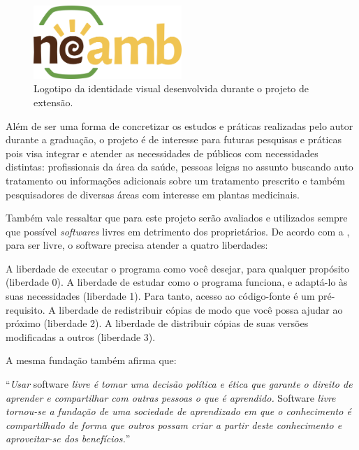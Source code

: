 \begin{figure}[!htbp]
\centering
\caption{\label{fig-neamb}Logotipo da identidade visual desenvolvida durante o projeto de extensão.}
\includegraphics[width=0.5\textwidth]{images/drive/image_5.png}
\end{figure}


Além de ser uma forma de concretizar os estudos e práticas realizadas pelo autor durante a graduação, o projeto é de interesse para futuras pesquisas e práticas pois visa integrar e atender as necessidades de públicos com necessidades distintas: profissionais da área da saúde, pessoas leigas no assunto buscando auto tratamento ou informações adicionais sobre um tratamento prescrito e também pesquisadores de diversas áreas com interesse em plantas medicinais.

Também vale ressaltar que para este projeto serão avaliados e utilizados sempre que possível \emph{softwares} livres em detrimento dos proprietários. De acordo com a \textcite{gnuproj}, para ser livre, o software precisa atender a quatro liberdades:

\begin{citacao}
A liberdade de executar o programa como você desejar, para qualquer propósito (liberdade 0). A liberdade de estudar como o programa funciona, e adaptá-lo às suas necessidades (liberdade 1). Para tanto, acesso ao código-fonte é um pré-requisito. A liberdade de redistribuir cópias de modo que você possa ajudar ao próximo (liberdade 2). A liberdade de distribuir cópias de suas versões modificadas a outros (liberdade 3).
\end{citacao}

A mesma fundação também afirma que:

\begin{citacao}
``\emph{Usar} software \emph{livre é tomar uma decisão política e ética que garante o direito de aprender e compartilhar com outras pessoas o que é aprendido.} Software \emph{livre tornou-se a fundação de uma sociedade de aprendizado em que o conhecimento é compartilhado de forma que outros possam criar a partir deste conhecimento e aproveitar-se dos benefícios.}'' \textcite{fsf}
\end{citacao}

